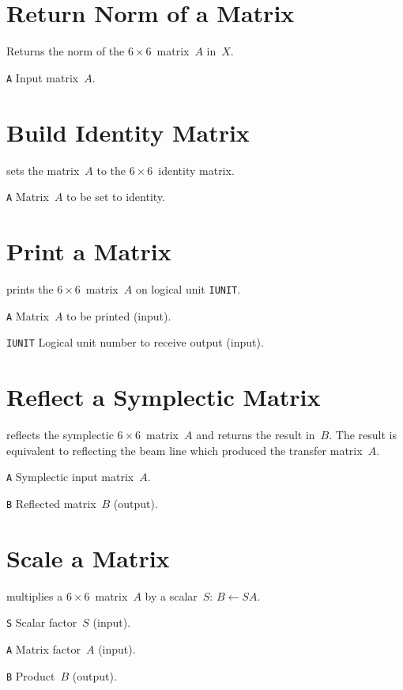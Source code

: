 \section{Return Norm of a Matrix}
\label{M66NRM}
Returns the norm of the $6 \times 6$~matrix~$A$ in~$X$.
\begin{mylist}
\item[\tt A]
Input matrix~$A$.
\end{mylist}

\section{Build Identity Matrix}
\label{M66ONE}
sets the matrix~$A$ to the $6 \times 6$~identity matrix.
\begin{mylist}
\item[\tt A]
Matrix~$A$ to be set to identity.
\end{mylist}

\section{Print a Matrix}
\label{M66PRT}
prints the $6 \times 6$~matrix~$A$ on logical unit {\tt IUNIT}.
\begin{mylist}
\item[\tt A]
Matrix~$A$ to be printed (input).
\item[\tt IUNIT]
Logical unit number to receive output (input).
\end{mylist}

\section{Reflect a Symplectic Matrix}
\label{M66REF}
reflects the symplectic $6 \times 6$~matrix~$A$ and returns the result
in~$B$.
The result is equivalent to reflecting the beam line which produced the
transfer matrix~$A$.
\begin{mylist}
\item[\tt A]
Symplectic input matrix~$A$.
\item[\tt B]
Reflected matrix~$B$ (output).
\end{mylist}

\section{Scale a Matrix}
\label{M66SCL}
multiplies a $6 \times 6$~matrix~$A$ by a scalar~$S$:
$B \leftarrow S A$.
\begin{mylist}
\item[\tt S]
Scalar factor~$S$ (input).
\item[\tt A]
Matrix factor~$A$ (input).
\item[\tt B]
Product~$B$ (output).
\end{mylist}
                   
